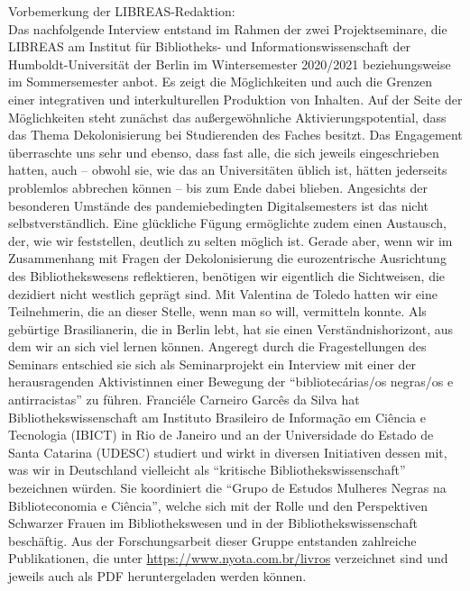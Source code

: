 \documentclass[a4paper,
fontsize=11pt,
oneside,
numbers=noperiodatend,
parskip=half-,
bibliography=totoc,
final
]{scrartcl}
\begin{document}
Vorbemerkung der LIBREAS-Redaktion:\\
Das nachfolgende Interview entstand im Rahmen der zwei Projektseminare,
die LIBREAS am Institut für Bibliotheks- und Informationswissenschaft
der Humboldt-Universität der Berlin im Wintersemester 2020/2021
beziehungsweise im Sommersemester anbot. Es zeigt die Möglichkeiten und
auch die Grenzen einer integrativen und interkulturellen Produktion von
Inhalten. Auf der Seite der Möglichkeiten steht zunächst das
außergewöhnliche Aktivierungspotential, dass das Thema Dekolonisierung
bei Studierenden des Faches besitzt. Das Engagement überraschte uns sehr
und ebenso, dass fast alle, die sich jeweils eingeschrieben hatten, auch
-- obwohl sie, wie das an Universitäten üblich ist, hätten jederseits
problemlos abbrechen können -- bis zum Ende dabei blieben. Angesichts
der besonderen Umstände des pandemiebedingten Digitalsemesters ist das
nicht selbstverständlich. Eine glückliche Fügung ermöglichte zudem einen
Austausch, der, wie wir feststellen, deutlich zu selten möglich ist.
Gerade aber, wenn wir im Zusammenhang mit Fragen der Dekolonisierung die
eurozentrische Ausrichtung des Bibliothekswesens reflektieren, benötigen
wir eigentlich die Sichtweisen, die dezidiert nicht westlich geprägt
sind. Mit Valentina de Toledo hatten wir eine Teilnehmerin, die an
dieser Stelle, wenn man so will, vermitteln konnte. Als gebürtige
Brasilianerin, die in Berlin lebt, hat sie einen Verständnishorizont,
aus dem wir an sich viel lernen können. Angeregt durch die
Fragestellungen des Seminars entschied sie sich als Seminarprojekt ein
Interview mit einer der herausragenden Aktivistinnen einer Bewegung der
\enquote{bibliotecárias/os negras/os e antirracistas} zu führen.
Franciéle Carneiro Garcês da Silva hat Bibliothekswissenschaft am
Instituto Brasileiro de Informação em Ciência e Tecnologia (IBICT) in
Rio de Janeiro und an der Universidade do Estado de Santa Catarina
(UDESC) studiert und wirkt in diversen Initiativen dessen mit, was wir
in Deutschland vielleicht als \enquote{kritische
Bibliothekswissenschaft} bezeichnen würden. Sie koordiniert die
\enquote{Grupo de Estudos Mulheres Negras na Biblioteconomia e Ciência},
welche sich mit der Rolle und den Perspektiven Schwarzer Frauen im
Bibliothekswesen und in der Bibliothekswissenschaft beschäftig. Aus der
Forschungsarbeit dieser Gruppe entstanden zahlreiche Publikationen, die
unter \url{https://www.nyota.com.br/livros} verzeichnet sind und jeweils
auch als PDF heruntergeladen werden können.
\end{document}
